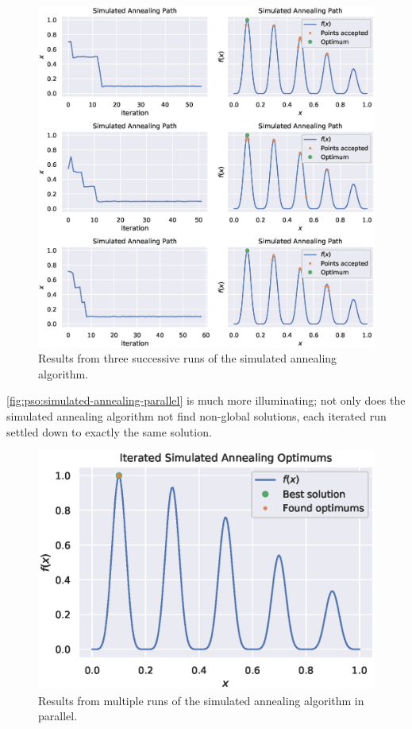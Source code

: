 \documentclass[12pt]{article}
\begin{document}
\begin{figure}[H]
    \centering
    \includegraphics[width=\textwidth]{figures/pso/prob1-simulated-annealing-results.eps}
    \caption{Results from three successive runs of the simulated annealing algorithm.}\label{fig:pso:simulated-annealing-results}
\end{figure}

\autoref{fig:pso:simulated-annealing-parallel} is much more illuminating; not only does the simulated annealing algorithm not find non-global solutions, each iterated run settled down to exactly the same solution.

\begin{figure}[H]
    \centering
    \includegraphics{figures/pso/prob1-simulated-annealing-solutions.eps}
    \caption{Results from multiple runs of the simulated annealing algorithm in parallel.}\label{fig:pso:simulated-annealing-parallel}
\end{figure}
\end{document}

